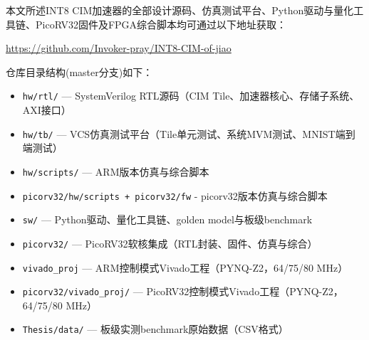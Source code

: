 \documentclass[bachelor,compact,nofont]{xjtuthesis}
\numberwithin{equation}{chapter}
\begin{document}

本文所述INT8 CIM加速器的全部设计源码、仿真测试平台、Python驱动与量化工具链、PicoRV32固件及FPGA综合脚本均可通过以下地址获取：

\begin{center}
\url{https://github.com/Invoker-pray/INT8-CIM-of-jiao}
\end{center}

仓库目录结构(master分支)如下：

\begin{itemize}
\item \texttt{hw/rtl/} — SystemVerilog RTL源码（CIM Tile、加速器核心、存储子系统、AXI接口）
\item \texttt{hw/tb/} — VCS仿真测试平台（Tile单元测试、系统MVM测试、MNIST端到端测试）
\item \texttt{hw/scripts/} — ARM版本仿真与综合脚本
\item \texttt{picorv32/hw/scripts + picorv32/fw} - picorv32版本仿真与综合脚本
\item \texttt{sw/} — Python驱动、量化工具链、golden model与板级benchmark
\item \texttt{picorv32/} — PicoRV32软核集成（RTL封装、固件、仿真与综合）
\item \texttt{vivado\_proj} — ARM控制模式Vivado工程（PYNQ-Z2，64/75/80 MHz）
\item \texttt{picorv32/vivado\_proj/} — PicoRV32控制模式Vivado工程（PYNQ-Z2，64/75/80 MHz）
\item \texttt{Thesis/data/} — 板级实测benchmark原始数据（CSV格式）
\end{itemize}

\xjtuendappendix
\end{document}
